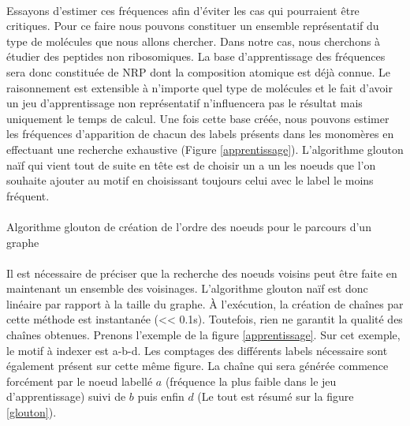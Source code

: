 \documentclass[12pt,french,twoside]{report}
\begin{document}
\paragraph{}Essayons d'estimer ces fréquences afin d'éviter les cas qui pourraient être critiques. Pour ce faire nous pouvons
constituer un ensemble représentatif du type de molécules que nous allons chercher.
Dans notre cas, nous cherchons à étudier des peptides non ribosomiques. La base d'apprentissage
des fréquences sera donc constituée de NRP dont la composition atomique est déjà connue. Le raisonnement est extensible à
n'importe quel type de molécules et le fait d'avoir un jeu d'apprentissage non représentatif n'influencera pas le résultat mais
uniquement le temps de calcul. Une fois cette base créée, nous pouvons estimer les fréquences d'apparition de chacun des labels
présents dans les monomères en effectuant une recherche exhaustive (Figure \ref{apprentissage}). L'algorithme glouton naïf qui
vient tout de suite en tête est de choisir un a un les noeuds que l'on souhaite ajouter au motif en choisissant toujours celui
avec le label le moins fréquent.

\paragraph{}
  \begin{algorithm}[H]
    \caption{Algorithme glouton de création de l'ordre des noeuds pour le parcours d'un graphe}
 
  \end{algorithm}


\paragraph{}Il est nécessaire de préciser que la recherche des noeuds voisins peut être faite en maintenant
un ensemble des voisinages. L'algorithme glouton naïf est donc linéaire par rapport à la taille du graphe. À l'exécution, la
création de chaînes par cette méthode est instantanée (<< 0.1s). Toutefois, rien ne garantit la qualité des chaînes obtenues.
Prenons l'exemple de la figure \ref{apprentissage}. Sur cet exemple, le motif à indexer est a-b-d. Les comptages des différents
labels nécessaire sont également présent sur cette même figure. La chaîne qui sera générée commence forcément par le noeud
labellé $a$ (fréquence la plus faible dans le jeu d'apprentissage) suivi de $b$ puis enfin $d$ (Le tout est résumé sur la figure
\ref{glouton}).
\end{document}
